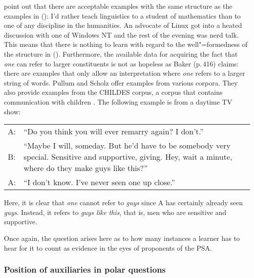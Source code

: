 \citet[]{PS2002a} point out that there are acceptable examples with the same structure as
the examples in (): 
\eal
\ex I'd rather teach linguistics to a student of mathematics than to
one of any discipline in the humanities.
\ex An advocate of Linux got into a heated discussion with one of
Windows NT and the rest of the evening was nerd talk.
\zl
This means that there is nothing to learn with regard to the well"=formedness of the structure in ().
Furthermore, the available data for acquiring the fact that \emph{one} can refer to larger constituents is not as hopeless
as Baker (p.\,416) claims: there are examples that only allow an interpretation where \emph{one} refers to a larger
string of words. Pullum and Scholz offer examples from various corpora. They also provide examples from the CHILDES corpus,
a corpus that contains communication with children \citep{MacWhinny95a-u}. The following example is from a daytime TV show:
\eanoraggedright
\begin{tabular}[t]{@{}l@{~}p{11cm}}
A: & ``Do you think you will ever remarry again? I don't.''\\
B: & ``Maybe I will, someday. But he'd have to be somebody very special. Sensitive and supportive, giving. Hey, wait a minute, where
   do they make guys like this?''\\
A: & ``I don't know. I've never seen one up close.''\\
\end{tabular}
\z
Here, it is clear that \emph{one}  cannot refer to \emph{guys} since A has certainly already seen \emph{guys}.
Instead, it refers to \emph{guys like this}, that is, men who are sensitive and supportive.   

Once again, the question arises here as to how many instances a learner has to hear for it to count as evidence in the eyes
of proponents of the PSA.

\subsubsection{Position of auxiliaries in polar questions}
\label{Abschnitt-Hilfsverbumstellung}

